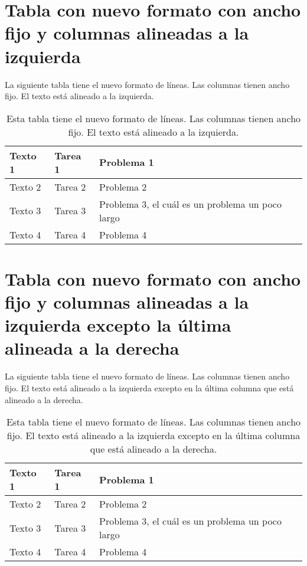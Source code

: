 \section*{Tabla con nuevo formato con ancho fijo y columnas alineadas a la izquierda}

La siguiente tabla tiene el nuevo formato de líneas. Las columnas tienen ancho fijo. El texto está alineado a la izquierda.

\begin{table}[h]
	\centering
	\begin{tabular}{>{\raggedright\arraybackslash}p{2cm} >{\raggedright\arraybackslash}p{2.5cm} >{\raggedright\arraybackslash}p{5cm}}
		\toprule[2pt]
		\textbf{Texto 1} & \textbf{Tarea 1} & \textbf{Problema 1} \\
		\midrule[1.5pt]
		Texto 2 & Tarea 2 & Problema 2 \\
		\hline
		Texto 3 & Tarea 3 & Problema 3, el cuál es un problema un poco largo \\
		\hline
		Texto 4 & Tarea 4 & Problema 4 \\
		\bottomrule[2pt]
	\end{tabular}
	\caption[Tabla con nuevo formato con ancho fijo y columnas alineadas a la izquierda]{Esta tabla tiene el nuevo formato de líneas. Las columnas tienen ancho fijo. El texto está alineado a la izquierda.}
	\label{table11}
\end{table}

\section*{Tabla con nuevo formato con ancho fijo y columnas alineadas a la izquierda excepto la última alineada a la derecha}

La siguiente tabla tiene el nuevo formato de líneas. Las columnas tienen ancho fijo. El texto está alineado a la izquierda excepto en la última columna que está alineado a la derecha.

\begin{table}[h]
	\centering
	\begin{tabular}{>{\raggedright\arraybackslash}p{2cm} >{\raggedright\arraybackslash}p{2.5cm} >{\raggedleft\arraybackslash}p{5cm}}
		\toprule[2pt]
		\textbf{Texto 1} & \textbf{Tarea 1} & \textbf{Problema 1} \\
		\midrule[1.5pt]
		Texto 2 & Tarea 2 & Problema 2 \\
		\hline
		Texto 3 & Tarea 3 & Problema 3, el cuál es un problema un poco largo \\
		\hline
		Texto 4 & Tarea 4 & Problema 4 \\
		\bottomrule[2pt]
	\end{tabular}
	\caption[Tabla con nuevo formato con ancho fijo y columnas alineadas a la izquierda excepto la última alineada a la derecha]{Esta tabla tiene el nuevo formato de líneas. Las columnas tienen ancho fijo. El texto está alineado a la izquierda excepto en la última columna que está alineado a la derecha.}
	\label{table12}
\end{table}

